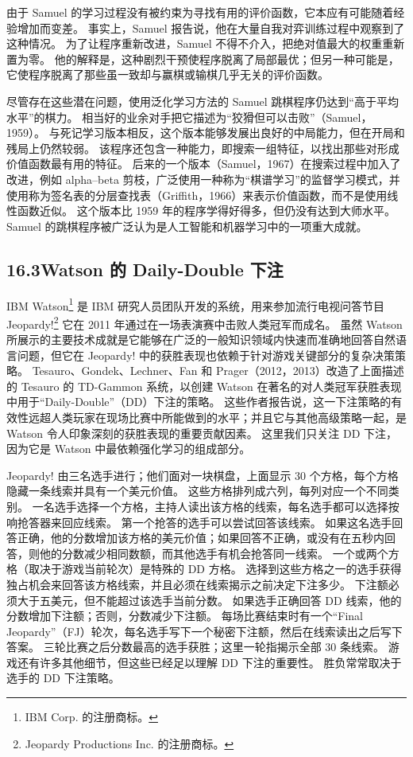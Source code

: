\documentclass[UTF8,12pt,a4paper,fontset=fandol]{ctexart}
\begin{document}
由于 Samuel 的学习过程没有被约束为寻找有用的评价函数，它本应有可能随着经验增加而变差。
事实上，Samuel 报告说，他在大量自我对弈训练过程中观察到了这种情况。
为了让程序重新改进，Samuel 不得不介入，把绝对值最大的权重重新置为零。
他的解释是，这种剧烈干预使程序脱离了局部最优；但另一种可能是，它使程序脱离了那些虽一致却与赢棋或输棋几乎无关的评价函数。

尽管存在这些潜在问题，使用泛化学习方法的 Samuel 跳棋程序仍达到“高于平均水平”的棋力。
相当好的业余对手把它描述为“狡猾但可以击败”（Samuel，1959）。
与死记学习版本相反，这个版本能够发展出良好的中局能力，但在开局和残局上仍然较弱。
该程序还包含一种能力，即搜索一组特征，以找出那些对形成价值函数最有用的特征。
后来的一个版本（Samuel，1967）在搜索过程中加入了改进，例如 alpha--beta 剪枝，广泛使用一种称为“棋谱学习”的监督学习模式，并使用称为签名表的分层查找表（Griffith，1966）来表示价值函数，而不是使用线性函数近似。
这个版本比 1959 年的程序学得好得多，但仍没有达到大师水平。
Samuel 的跳棋程序被广泛认为是人工智能和机器学习中的一项重大成就。

\subsection*{16.3\quad Watson 的 Daily-Double 下注}

IBM Watson\footnote{IBM Corp. 的注册商标。} 是 IBM 研究人员团队开发的系统，用来参加流行电视问答节目 Jeopardy!\footnote{Jeopardy Productions Inc. 的注册商标。}
它在 2011 年通过在一场表演赛中击败人类冠军而成名。
虽然 Watson 所展示的主要技术成就是它能够在广泛的一般知识领域内快速而准确地回答自然语言问题，但它在 Jeopardy! 中的获胜表现也依赖于针对游戏关键部分的复杂决策策略。
Tesauro、Gondek、Lechner、Fan 和 Prager（2012，2013）改造了上面描述的 Tesauro 的 TD-Gammon 系统，以创建 Watson 在著名的对人类冠军获胜表现中用于“Daily-Double”（DD）下注的策略。
这些作者报告说，这一下注策略的有效性远超人类玩家在现场比赛中所能做到的水平；并且它与其他高级策略一起，是 Watson 令人印象深刻的获胜表现的重要贡献因素。
这里我们只关注 DD 下注，因为它是 Watson 中最依赖强化学习的组成部分。

Jeopardy! 由三名选手进行；他们面对一块棋盘，上面显示 30 个方格，每个方格隐藏一条线索并具有一个美元价值。
这些方格排列成六列，每列对应一个不同类别。
一名选手选择一个方格，主持人读出该方格的线索，每名选手都可以选择按响抢答器来回应线索。
第一个抢答的选手可以尝试回答该线索。
如果这名选手回答正确，他的分数增加该方格的美元价值；如果回答不正确，或没有在五秒内回答，则他的分数减少相同数额，而其他选手有机会抢答同一线索。
一个或两个方格（取决于游戏当前轮次）是特殊的 DD 方格。
选择到这些方格之一的选手获得独占机会来回答该方格线索，并且必须在线索揭示之前决定下注多少。
下注额必须大于五美元，但不能超过该选手当前分数。
如果选手正确回答 DD 线索，他的分数增加下注额；否则，分数减少下注额。
每场比赛结束时有一个“Final Jeopardy”（FJ）轮次，每名选手写下一个秘密下注额，然后在线索读出之后写下答案。
三轮比赛之后分数最高的选手获胜；这里一轮指揭示全部 30 条线索。
游戏还有许多其他细节，但这些已经足以理解 DD 下注的重要性。
胜负常常取决于选手的 DD 下注策略。
\end{document}
